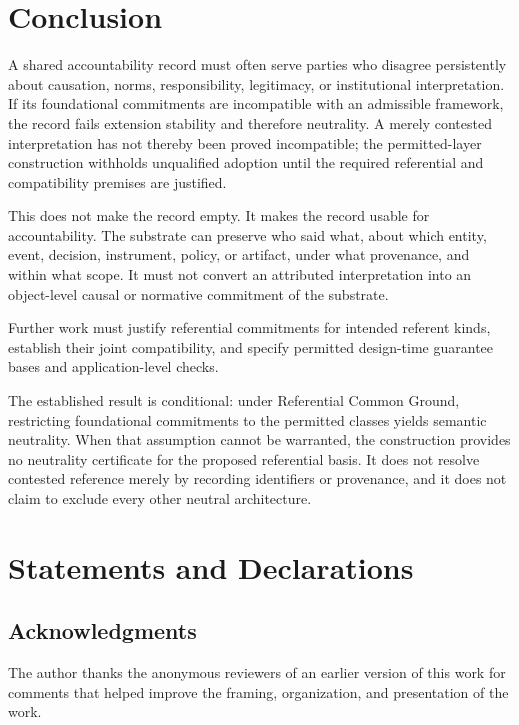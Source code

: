 \documentclass[11pt]{article}
\theoremstyle{plain}
\theoremstyle{definition}
\theoremstyle{remark}
\begin{document}
\section{Conclusion}
\label{sec:conclusion}

A shared accountability record must often serve parties who disagree
persistently about causation, norms, responsibility, legitimacy, or
institutional interpretation.
If its foundational commitments are incompatible with an admissible
framework, the record fails extension stability and therefore neutrality.
A merely contested interpretation has not thereby been proved incompatible;
the permitted-layer construction withholds unqualified adoption until
the required referential and compatibility premises are justified.

This does not make the record empty.
It makes the record usable for accountability.
The substrate can preserve who said what,
about which entity, event, decision, instrument, policy, or artifact,
under what provenance,
and within what scope.
It must not convert an attributed interpretation into
an object-level causal or normative commitment of the substrate.

Further work must justify referential commitments for intended
referent kinds, establish their joint compatibility, and specify
permitted design-time guarantee bases and application-level checks.

The established result is conditional: under Referential Common Ground,
restricting foundational commitments to the permitted classes yields
semantic neutrality.
When that assumption cannot be warranted,
the construction provides no neutrality certificate for the proposed
referential basis.
It does not resolve contested reference merely
by recording identifiers or provenance, and it does not claim to
exclude every other neutral architecture.

\section*{Statements and Declarations}

\subsection*{Acknowledgments} The author thanks the anonymous reviewers
of an earlier version of this work for comments that helped improve
the framing, organization, and presentation of the work.
\end{document}
